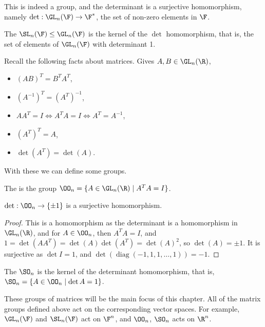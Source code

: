 This is indeed a group, and the determinant is a surjective homomorphism, namely $\det : \GL_n(\F) \rightarrow \F^*$, the set of non-zero elements in $\F$.

\begin{definition}
	The  $\SL_n(\F) \leq \GL_n(\F)$ is the kernel of the $\det$ homomorphism, that is, the set of elements of $\GL_n(\F)$ with determinant 1.
\end{definition}

Recall the following facts about matrices. Gives $A, B \in \GL_n(\R)$,
\begin{itemize}
	\item $(AB)^T = B^T A^T$,
	\item $(A^{-1})^T = (A^T)^{-1}$,
	\item $AA^{T} = I \iff A^{T} A = I \iff A^T = A^{-1}$,
	\item $(A^T)^T = A$,
	\item $\det(A^T) = \det(A)$.
\end{itemize}
With these we can define some groups.

\begin{definition}
	The  is the group $\OO_n = \{A \in \GL_n(\R) \mid A^T A = I\}$.
\end{definition}

\begin{proposition}
	$\det : \OO_n \rightarrow \{\pm 1\}$ is a surjective homomorphism. 
\end{proposition}
\begin{proof}
	This is a homomorphism as the determinant is a homomorphism in $\GL_n(\R)$, and for $A \in \OO_n$, then $A^T A = I$, and $1 = \det(A A^T) = \det(A)\det(A^T) = \det(A)^2$, so $\det(A) = \pm 1$. It is surjective as $\det I = 1$, and $\det(\operatorname{diag}(-1, 1, 1, \dots, 1)) = -1$.
\end{proof}

\begin{definition}
	The  $\SO_n$ is the kernel of the determinant homomorphism, that is, $\SO_n = \{A \in \OO_n \mid \det A = 1 \}$.
\end{definition}

These groups of matrices will be the main focus of this chapter.
All of the matrix groups defined above act on the corresponding vector spaces. For example, $\GL_n(\F)$ and $\SL_n(\F)$ act on $\F^n$, and $\OO_n$, $\SO_n$ acts on $\R^n$.

